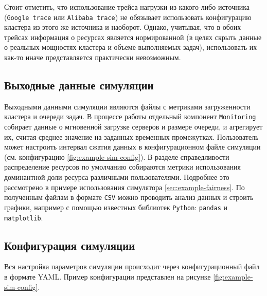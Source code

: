 Стоит отметить, что использование трейса нагрузки из какого-либо источника (\texttt{Google trace} или \texttt{Alibaba trace}) не обязывает использовать конфигурацию кластера из этого же источника и наоборот. Однако, учитывая, что в обоих трейсах информация о ресурсах является нормированной (в целях скрыть данные о реальных мощностях кластера и объеме выполняемых задач), использовать их как-то иначе представляется практически невозможным. 

\subsection{Выходные данные симуляции}\label{sec:output-monitoring}

Выходными данными симуляции являются файлы с метриками загруженности кластера и очереди задач. В процессе работы отдельный компонент \texttt{Monitoring} собирает данные о мгновенной загрузке серверов и размере очереди, и агрегирует их, считая среднее значение на заданных временных промежутках. Пользователь может настроить интервал сжатия данных в конфигурационном файле симуляции (см. конфигурацию \ref{fig:example-sim-config}). В разделе справедливости распределение ресурсов по умолчанию собираются метрики использования доминантной доли ресурса различными пользователями\cite{drf-article}. Подробнее это рассмотрено в примере использования симулятора \ref{sec:example-fairness}. По полученным файлам в формате \texttt{CSV} можно проводить анализ данных и строить графики, например с помощью известных библиотек \texttt{Python}: \texttt{pandas} и \texttt{matplotlib}. 

\subsection{Конфигурация симуляции}

Вся настройка параметров симуляции происходит через конфигурационный файл в формате YAML. Пример конфигурации представлен на рисунке \ref{fig:example-sim-config}. 

